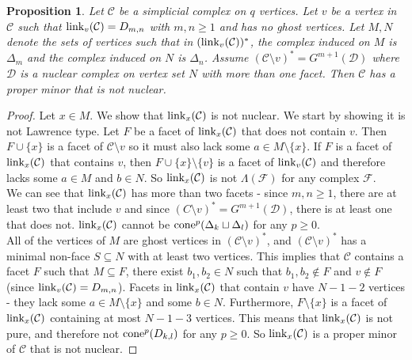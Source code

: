 \documentclass[letterpaper,12pt]{amsart}
\theoremstyle{plain}
\newtheorem{prop}[thm]{Proposition}
\theoremstyle{definition}
\theoremstyle{remark}
\newcommand{\calc}{\mathcal{C}}
\newcommand{\link}{\textnormal{link}}
\newcommand{\cone}{\textnormal{cone}}
\begin{document}
\begin{prop}\label{arbitrary}
	Let $\mathcal{C}$ be a simplicial complex on $q$ vertices.
	Let $v$ be a vertex in $\mathcal{C}$ such that $\link_v(\mathcal{C}) = D_{m,n}$ with $m,n \ge 1$
	and has no ghost vertices.
	Let $M,N$ denote the sets of vertices such that
	in $(\link_v(\mathcal{C}))^*$, the complex induced on $M$ is $\Delta_m$
	and the complex induced on $N$ is $\Delta_n$.
	Assume $(\mathcal{C}\setminus v)^* = G^{m+1}(\mathcal{D})$ where $\mathcal{D}$ is a nuclear complex on vertex set $N$
	with more than one facet.
	Then $\mathcal{C}$ has a proper minor that is not nuclear.
\end{prop}
\begin{proof}
	Let $x \in M$.
	We show that $\link_x(\mathcal{C})$ is not nuclear.
	{
	We start by showing it is not Lawrence type.
	Let $F$ be a facet of $\link_x(\mathcal{C})$ that does not contain $v$.
	Then $F \cup \{x\}$ is a facet of $\calc\setminus v$ so it must also lack some $a \in M \setminus \{x\}$.
	If $F$ is a facet of $\link_x(\calc)$ that contains $v$, then $F \cup \{x\} \setminus \{v\}$ is a facet of $\link_v(\calc)$
	and therefore lacks some $a \in M$ and $b\in N$.
	So $\link_x(\mathcal{C})$ is not $\Lambda(\mathcal{F})$ for any complex $\mathcal{F}$.
	\\
	\indent
	We can see that $\link_x(\mathcal{C})$ has more than two facets - since $m,n \ge 1$, there are at least two that include $v$
	and since $(C\setminus v)^* = G^{m+1}(\mathcal{D})$, there is at least one that does not.}
	$\link_x(\mathcal{C})$ cannot be $\cone^p(\Delta_k \sqcup \Delta_l)$ for any $p \ge 0$.
	\\
	\indent
	All of the vertices of $M$ are ghost vertices in $(\mathcal{C}\setminus v)^*$,
	and $(\mathcal{C}\setminus v)^*$ has a minimal non-face $S \subseteq N$ with at least two vertices.
	This implies that $\mathcal{C}$ contains a facet $F$ such that $M \subseteq F$,
	there exist $b_1,b_2 \in N$ such that $b_1,b_2 \notin F$ and $v \notin F$ (since $\link_v(\mathcal{C}) = D_{m,n}$).
	Facets in $\link_x(\mathcal{C})$ that contain $v$ have $N-1-2$ vertices - they lack some $a \in M\setminus\{x\}$ and some $b \in N$.
	Furthermore, $F\setminus\{x\}$ is a facet of $\link_x(\mathcal{C})$ containing at most $N-1-3$ vertices.
	This means that $\link_x(\mathcal{C})$ is not pure, and therefore not $\cone^p(D_{k,l})$ for any $p \ge 0$.
	So $\link_x(\mathcal{C})$ is a proper minor of $\mathcal{C}$ that is not nuclear.
\end{proof}
\end{document}
